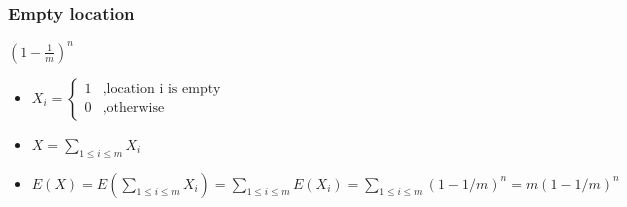 \documentclass[UTF8,11pt]{beamer}
\begin{document}
\begin{frame}
\frametitle{Empty location}
\begin{center}
\end{center}

\pause
\begin{block}{}
	\pause
	\begin{center}
		\textbf{\color{red}	$(1-\frac{1}{m})^n$}
	\end{center}
\end{block}

\pause
\begin{block}{}
	\begin{itemize}
		\pause
		\item $X_i=\left\lbrace \begin{array}{ll}
		1&, \text{location i is empty}\\
		0&, \text{otherwise}
		\end{array}\right. $
		\pause
		\item $X=\sum\limits_{1\le i\le m}{X_i}$
		\pause
		\item $E(X)=E(\sum\limits_{1\le i\le m}{X_i})=\sum\limits_{1\le i\le m}{E(X_i)}=\sum\limits_{1\le i\le m}{(1-1/m)^n}=m(1-1/m)^n$
	\end{itemize}
\end{block}
\end{frame}
\end{document}
